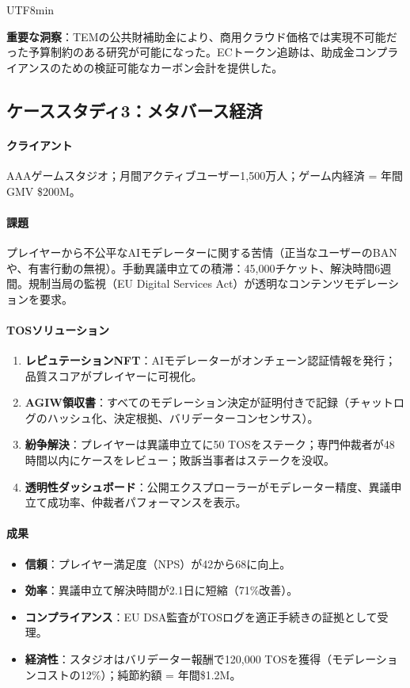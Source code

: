 \documentclass[11pt]{article}
\begin{document}
\begin{CJK}{UTF8}{min}
\begin{itemize}[noitemsep]
\textbf{重要な洞察}：TEMの公共財補助金により、商用クラウド価格では実現不可能だった予算制約のある研究が可能になった。ECトークン追跡は、助成金コンプライアンスのための検証可能なカーボン会計を提供した。

\subsection{ケーススタディ3：メタバース経済}

\paragraph{クライアント} AAAゲームスタジオ；月間アクティブユーザー1,500万人；ゲーム内経済 = 年間GMV \$200M。

\paragraph{課題} プレイヤーから不公平なAIモデレーターに関する苦情（正当なユーザーのBANや、有害行動の無視）。手動異議申立ての積滞：45,000チケット、解決時間6週間。規制当局の監視（EU Digital Services Act）が透明なコンテンツモデレーションを要求。

\paragraph{TOSソリューション}
\begin{enumerate}[noitemsep]
  \item \textbf{レピュテーションNFT}：AIモデレーターがオンチェーン認証情報を発行；品質スコアがプレイヤーに可視化。
  \item \textbf{AGIW領収書}：すべてのモデレーション決定が証明付きで記録（チャットログのハッシュ化、決定根拠、バリデーターコンセンサス）。
  \item \textbf{紛争解決}：プレイヤーは異議申立てに50 TOSをステーク；専門仲裁者が48時間以内にケースをレビュー；敗訴当事者はステークを没収。
  \item \textbf{透明性ダッシュボード}：公開エクスプローラーがモデレーター精度、異議申立て成功率、仲裁者パフォーマンスを表示。
\end{enumerate}

\paragraph{成果}
\begin{itemize}[noitemsep]
  \item \textbf{信頼}：プレイヤー満足度（NPS）が42から68に向上。
  \item \textbf{効率}：異議申立て解決時間が2.1日に短縮（71\%改善）。
  \item \textbf{コンプライアンス}：EU DSA監査がTOSログを適正手続きの証拠として受理。
  \item \textbf{経済性}：スタジオはバリデーター報酬で120,000 TOSを獲得（モデレーションコストの12\%）；純節約額 = 年間\$1.2M。
\end{itemize}


\end{itemize}
\end{CJK}
\end{document}
